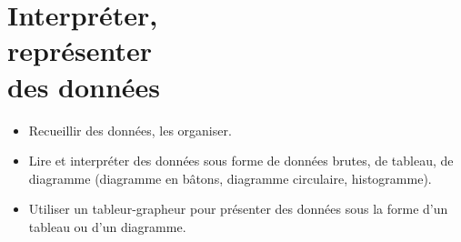 \themaO
\graphicspath{{../../S06_Interpreter_representer_des_donnees/Images/}}

\newcommand{\Cell}[1]{\fcolorbox[gray]{0.1}{0.9}{\begin{minipage}{2.5cm} #1 \end{minipage}}}
\newcommand{\cell}[1]{\fcolorbox[gray]{0.1}{0.9}{#1}}

\chapter{Interpréter,\\représenter\\des données}
\label{S06}

\begin{prerequis}
   \begin{itemize}
      \item[\com] Recueillir des données, les organiser.
      \item[\com] Lire et interpréter des données sous forme de données brutes, de tableau, de diagramme (diagramme en bâtons, diagramme circulaire, histogramme).
      \item[\com] Utiliser un tableur-grapheur pour présenter des données sous la forme d’un tableau ou d’un diagramme.
   \end{itemize}
\end{prerequis}

\vfill

